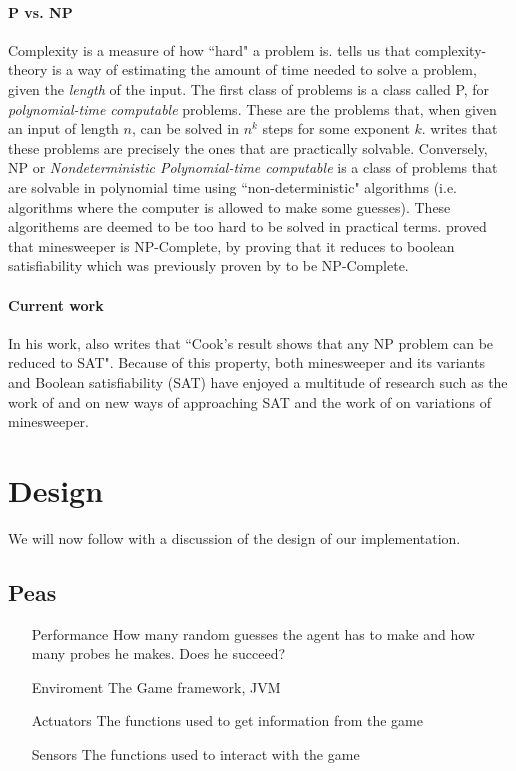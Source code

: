 \documentclass[british]{article}
\begin{document}
\paragraph{P vs. NP} Complexity is a measure of how ``hard" a problem is. \cite{Kaye00} tells us that complexity-theory is a way of estimating the amount of time needed to solve a problem, given the \textit{length} of the input. The first class of problems is a class called P, for \textit{polynomial-time computable} problems. These are the problems that, when given an input of length $n$, can be solved in $n^k$ steps for some exponent $k$. \citeauthor{Kaye00} writes that these problems are precisely the ones that are practically solvable. Conversely, NP or \textit{Nondeterministic Polynomial-time computable} is a class of problems that are solvable in polynomial time using ``non-deterministic" algorithms (i.e. algorithms where the computer is allowed to make some guesses). These algorithems are deemed to be too hard to be solved in practical terms.\cite{Kaye00} proved that minesweeper is NP-Complete, by proving that it reduces to boolean satisfiability which was previously proven by \cite{Cook71} to be NP-Complete.
\newpage
\paragraph{Current work} In his work, \cite{Kaye00} also writes that ``Cook's result shows that any NP problem can be reduced to SAT". Because of this property, both minesweeper and its variants and Boolean satisfiability (SAT) have enjoyed a multitude of research such as the work of \cite{Su2016,Mejia-Lavalle2016} and \cite{Meel2014} on new ways of approaching SAT and the work of \cite{Golan2011,Golan2014} on variations of minesweeper.



\section{Design}
\label{design}
We will now follow with a discussion of the design of our implementation.

\subsection{Peas}
\begin{enumerate}
\item[Performance] How many random guesses the agent has to make and how many probes he makes. Does he succeed?
\item[Enviroment] The Game framework, JVM
\item[Actuators]  The functions used to get information from the game
\item[Sensors] The functions used to interact with the game
\end{enumerate}
\end{document}
